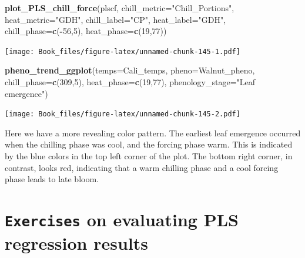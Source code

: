 \documentclass[
]{book}
\newenvironment{Shaded}{\begin{snugshade}}{\end{snugshade}}
\newcommand{\DataTypeTok}[1]{\textcolor[rgb]{0.13,0.29,0.53}{#1}}
\newcommand{\DecValTok}[1]{\textcolor[rgb]{0.00,0.00,0.81}{#1}}
\newcommand{\KeywordTok}[1]{\textcolor[rgb]{0.13,0.29,0.53}{\textbf{#1}}}
\newcommand{\NormalTok}[1]{#1}
\newcommand{\OperatorTok}[1]{\textcolor[rgb]{0.81,0.36,0.00}{\textbf{#1}}}
\newcommand{\StringTok}[1]{\textcolor[rgb]{0.31,0.60,0.02}{#1}}
\begin{document}
\begin{Shaded}
\begin{Highlighting}[]
\KeywordTok{plot_PLS_chill_force}\NormalTok{(plscf,}
                     \DataTypeTok{chill_metric=}\StringTok{"Chill_Portions"}\NormalTok{,}
                     \DataTypeTok{heat_metric=}\StringTok{"GDH"}\NormalTok{,}
                     \DataTypeTok{chill_label=}\StringTok{"CP"}\NormalTok{,}
                     \DataTypeTok{heat_label=}\StringTok{"GDH"}\NormalTok{,}
                     \DataTypeTok{chill_phase=}\KeywordTok{c}\NormalTok{(}\OperatorTok{-}\DecValTok{56}\NormalTok{,}\DecValTok{5}\NormalTok{),}
                     \DataTypeTok{heat_phase=}\KeywordTok{c}\NormalTok{(}\DecValTok{19}\NormalTok{,}\DecValTok{77}\NormalTok{))}
\end{Highlighting}
\end{Shaded}

\texttt{[image: Book\_files/figure-latex/unnamed-chunk-145-1.pdf]}

\begin{Shaded}
\begin{Highlighting}[]
\KeywordTok{pheno_trend_ggplot}\NormalTok{(}\DataTypeTok{temps=}\NormalTok{Cali_temps,}
                   \DataTypeTok{pheno=}\NormalTok{Walnut_pheno,}
                   \DataTypeTok{chill_phase=}\KeywordTok{c}\NormalTok{(}\DecValTok{309}\NormalTok{,}\DecValTok{5}\NormalTok{),}
                   \DataTypeTok{heat_phase=}\KeywordTok{c}\NormalTok{(}\DecValTok{19}\NormalTok{,}\DecValTok{77}\NormalTok{),}
                   \DataTypeTok{phenology_stage=}\StringTok{"Leaf emergence"}\NormalTok{)}
\end{Highlighting}
\end{Shaded}

\texttt{[image: Book\_files/figure-latex/unnamed-chunk-145-2.pdf]}

Here we have a more revealing color pattern. The earliest leaf emergence occurred when the chilling phase was cool, and the forcing phase warm. This is indicated by the blue colors in the top left corner of the plot. The bottom right corner, in contrast, looks red, indicating that a warm chilling phase and a cool forcing phase leads to late bloom.

\hypertarget{exercises_PLS_eval}{%
\section*{\texorpdfstring{\texttt{Exercises} on evaluating PLS regression results}{Exercises on evaluating PLS regression results}}\label{exercises_PLS_eval}}
\end{document}

